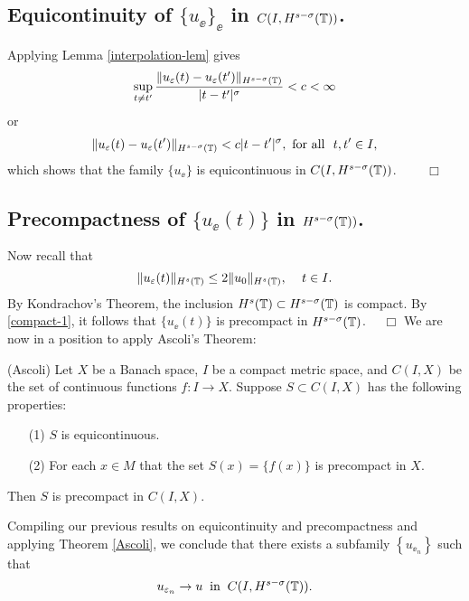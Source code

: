 		\subsection{  Equicontinuity of $\{u_\ee\}_\ee$  in
		$C(I,H^{s-\sigma}(\mathbb{T}))$.} Applying  Lemma \ref{interpolation-lem} gives 
		\begin{equation}
			\label{equic-1}
			\sup_{t \neq t'} \frac { \|u_\varepsilon(t) - u_\varepsilon(t') \|_{H^{s -
			\sigma}(\mathbb{T})}}{|t - t'|^\sigma} < c<\infty
		\end{equation}
		or
		\begin{equation}
			\label{equic-2}
			\|u_\varepsilon(t) - u_\varepsilon(t') \|_{H^{s - \sigma}(\mathbb{T})}< c|t - t'|^\sigma, 
			\text{ for all }  \,\,  t, t'\in I,
		\end{equation}
		which shows that  the family  $\{u_\ee\}$ is equicontinuous in 
		$C(I, H^{s-\sigma}(\mathbb{T}))$. $\qquad \Box$
		\subsection{ Precompactness of $\{u_\ee(t)\}$ in $H^{s-\sigma}(\mathbb{T}))$.}
		Now recall that
		\begin{equation}
			\label{compact-1}
			\|u_\varepsilon(t)\|_{H^{s}(\mathbb{T})}
			\le
			2 \|u_0 \|_{H^s(\mathbb{T})}, \,
			\quad
			t\in I.
		\end{equation}
		By Kondrachov's Theorem, the inclusion $H^s(\mathbb{T}) \subset H^{s-
		\sigma }(\mathbb{T})$ is compact. By \eqref{compact-1},
		it follows that $\{u_\ee(t)\}$ is precompact in $H^{s-\sigma}(\mathbb{T})$.
		$\quad \Box$
		We are now in a position to apply Ascoli's Theorem: 
		\begin{theorem}
			\label{Ascoli}
			(Ascoli)  Let $X$ be a Banach space, $I$ be a compact metric space,
			and $C(I,X)$  be the set of continuous functions $f: I\longrightarrow X$.
			Suppose $S \subset C(I,X)$  has the following properties:
			\begin{itemize}
				\item[(1)]   $S$ is  equicontinuous.
				\item[(2)]  For each $x \in M$ that the set $S(x) = \{f(x)\}$  is  precompact in $X$.
			\end{itemize} 
			Then $S$  is  precompact  in  $C(I,X)$.
		\end{theorem}
		Compiling our previous results on equicontinuity and precompactness
		and applying Theorem \ref{Ascoli}, we
		conclude that there exists a subfamily $\left\{ u_{\ee_n} \right\}$
		such that
		\begin{equation}
			\label{strong-conv-of-u_ep}
			u_{\varepsilon_n} \to u \; \; \text{in} \; \; C(I, H^{s-\sigma}(\mathbb{T})).
		\end{equation}
